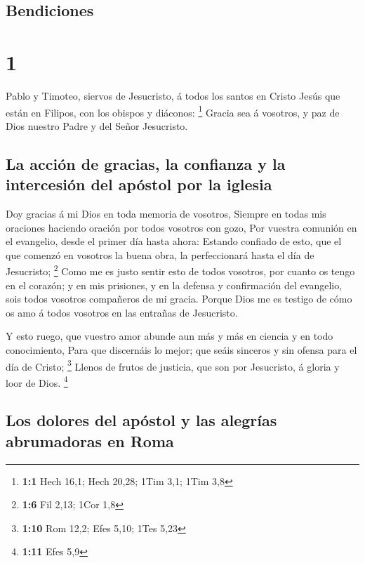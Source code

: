 \hypertarget{bendiciones}{%
\subsection{Bendiciones}\label{bendiciones}}

\hypertarget{section}{%
\section{1}\label{section}}

 Pablo y Timoteo, siervos de Jesucristo, á todos los
santos en Cristo Jesús que están en Filipos, con los obispos y diáconos:
\footnote{\textbf{1:1} Hech 16,1; Hech 20,28; 1Tim 3,1; 1Tim 3,8}
 Gracia sea á vosotros, y paz de Dios nuestro Padre y del
Señor Jesucristo.

\hypertarget{la-acciuxf3n-de-gracias-la-confianza-y-la-intercesiuxf3n-del-apuxf3stol-por-la-iglesia}{%
\subsection{La acción de gracias, la confianza y la intercesión del
apóstol por la
iglesia}\label{la-acciuxf3n-de-gracias-la-confianza-y-la-intercesiuxf3n-del-apuxf3stol-por-la-iglesia}}

 Doy gracias á mi Dios en toda memoria de vosotros,
 Siempre en todas mis oraciones haciendo oración por todos
vosotros con gozo,  Por vuestra comunión en el evangelio,
desde el primer día hasta ahora:  Estando confiado de
esto, que el que comenzó en vosotros la buena obra, la perfeccionará
hasta el día de Jesucristo; \footnote{\textbf{1:6} Fil 2,13; 1Cor 1,8}
 Como me es justo sentir esto de todos vosotros, por
cuanto os tengo en el corazón; y en mis prisiones, y en la defensa y
confirmación del evangelio, sois todos vosotros compañeros de mi gracia.
 Porque Dios me es testigo de cómo os amo á todos vosotros
en las entrañas de Jesucristo.

 Y esto ruego, que vuestro amor abunde aun más y más en
ciencia y en todo conocimiento,  Para que discernáis lo
mejor; que seáis sinceros y sin ofensa para el día de Cristo;
\footnote{\textbf{1:10} Rom 12,2; Efes 5,10; 1Tes 5,23} 
Llenos de frutos de justicia, que son por Jesucristo, á gloria y loor de
Dios. \footnote{\textbf{1:11} Efes 5,9}

\hypertarget{los-dolores-del-apuxf3stol-y-las-alegruxedas-abrumadoras-en-roma}{%
\subsection{Los dolores del apóstol y las alegrías abrumadoras en
Roma}\label{los-dolores-del-apuxf3stol-y-las-alegruxedas-abrumadoras-en-roma}}

